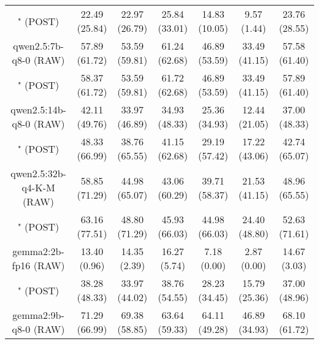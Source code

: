 \begin{table}[]
{\begin{tabular}{ccccccc}
      \multicolumn{1}{c|}{" (POST)} & 22.49 (25.84) & 22.97 (26.79) & \multicolumn{1}{c|}{25.84 (33.01)} & 14.83 (10.05) & \multicolumn{1}{c|}{9.57 (1.44)} & 23.76 (28.55) \\
      \cline{1-7}

      \multicolumn{1}{c|}{qwen2.5:7b-q8-0 (RAW)} & 57.89 (61.72) & 53.59 (59.81) & \multicolumn{1}{c|}{61.24 (62.68)} & 46.89 (53.59) & \multicolumn{1}{c|}{33.49 (41.15)} & 57.58 (61.40) \\

      \multicolumn{1}{c|}{" (POST)} & 58.37 (61.72) & 53.59 (59.81) & \multicolumn{1}{c|}{61.72 (62.68)} & 46.89 (53.59) & \multicolumn{1}{c|}{33.49 (41.15)} & 57.89 (61.40) \\
      \cline{1-7}

      \multicolumn{1}{c|}{qwen2.5:14b-q8-0 (RAW)} & 42.11 (49.76) & 33.97 (46.89) & \multicolumn{1}{c|}{34.93 (48.33)} & 25.36 (34.93) & \multicolumn{1}{c|}{12.44 (21.05)} & 37.00 (48.33) \\

      \multicolumn{1}{c|}{" (POST)} & 48.33 (66.99) & 38.76 (65.55) & \multicolumn{1}{c|}{41.15 (62.68)} & 29.19 (57.42) & \multicolumn{1}{c|}{17.22 (43.06)} & 42.74 (65.07) \\
      \cline{1-7}

      \multicolumn{1}{c|}{qwen2.5:32b-q4-K-M (RAW)} & 58.85 (71.29) & 44.98 (65.07) & \multicolumn{1}{c|}{43.06 (60.29)} & 39.71 (58.37) & \multicolumn{1}{c|}{21.53 (41.15)} & 48.96 (65.55) \\

      \multicolumn{1}{c|}{" (POST)} & 63.16 (77.51) & 48.80 (71.29) & \multicolumn{1}{c|}{45.93 (66.03)} & 44.98 (66.03) & \multicolumn{1}{c|}{24.40 (48.80)} & 52.63 (71.61) \\
      \cline{1-7}

      \multicolumn{1}{c|}{gemma2:2b-fp16 (RAW)} & 13.40 (0.96) & 14.35 (2.39) & \multicolumn{1}{c|}{16.27 (5.74)} & 7.18 (0.00) & \multicolumn{1}{c|}{2.87 (0.00)} & 14.67 (3.03) \\

      \multicolumn{1}{c|}{" (POST)} & 38.28 (48.33) & 33.97 (44.02) & \multicolumn{1}{c|}{38.76 (54.55)} & 28.23 (34.45) & \multicolumn{1}{c|}{15.79 (25.36)} & 37.00 (48.96) \\
      \cline{1-7}

      \multicolumn{1}{c|}{gemma2:9b-q8-0 (RAW)} & 71.29 (66.99) & 69.38 (58.85) & \multicolumn{1}{c|}{63.64 (59.33)} & 64.11 (49.28) & \multicolumn{1}{c|}{46.89 (34.93)} & 68.10 (61.72) \\


\end{tabular}}
\end{table}
